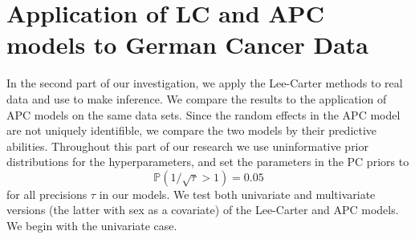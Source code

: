 \newpage
\section{Application of LC and APC models to German Cancer Data}
\label{sec:real-data}
In the second part of our investigation, we apply the Lee-Carter methods to real data and use \inlabru to make inference. We compare the results to the application of APC models on the same data sets. Since the random effects in the APC model are not uniquely identifible, we compare the two models by their predictive abilities. Throughout this part of our research we use uninformative prior distributions for the hyperparameters, and set the parameters in the PC priors to
\begin{equation*}
    \mathbb{P}(1/\sqrt{\tau} > 1) = 0.05
\end{equation*}
for all precisions $\tau$ in our models. We test both univariate and multivariate versions (the latter with sex as a covariate) of the Lee-Carter and APC models. We begin with the univariate case. 

